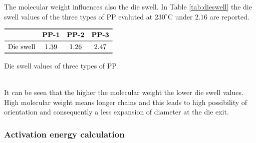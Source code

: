 \documentclass[a4paper, 11pt]{article}
\begin{document}
\newpage
The molecular weight influences also the die swell. In Table \ref{tab:dieswell} the die swell values of the three types of PP evaluted at $230 ^\circ$C under $2.16$  are reported.
\begin{table}[htp]
\centering
$
\begin{array}{cccc}
\toprule
\text{} & \textbf{PP-1} & \textbf{PP-2} & \textbf{PP-3} \\
\midrule
\text{Die swell} & 1.39 & 1.26 & 2.47  \\
\bottomrule
\end{array}
$
\caption{Die swell values of three types of PP.}
\label{tab:dieswell}
\end{table}\\
It can be seen that the higher the molecular weight the lower die swell values. High molecular weight means longer chains and this leads to high possibility of orientation and consequently a less expansion of diameter at the die exit.

\subsubsection{Activation energy calculation}
\end{document}
